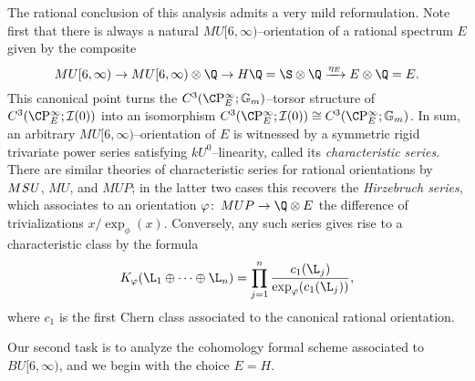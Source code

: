 \begin{remark}
The rational conclusion of this analysis admits a very mild reformulation.  Note first that there is always a natural \(MU[6, \infty)\)--orientation of a rational spectrum \(E\) given by the composite \[MU[6, \infty) \to MU[6, \infty) \otimes \Q \to H\Q = \S \otimes \Q \xrightarrow{\eta_E} E \otimes \Q = E.\]  This canonical point turns the \(C^3(\CP^\infty_E; \Gm)\)--torsor structure of \(C^3(\CP^\infty_E; \sheaf I(0))\) into an isomorphism \(C^3(\CP^\infty_E; \sheaf I(0)) \cong C^3(\CP^\infty_E; \Gm)\).  In sum, an arbitrary \(MU[6, \infty)\)--orientation of \(E\) is witnessed by a symmetric rigid trivariate power series satisfying \(kU^0\)--linearity, called its \textit{characteristic series}.  There are similar theories of characteristic series for rational orientations by \(M\mathit{SU}\), \(MU\), and \(MUP\); in the latter two cases this recovers the \textit{Hirzebruch series}, which associates to an orientation \(\phi\co MUP \to \Q \otimes E\) the difference of trivializations \(x / \exp_\phi(x)\).  Conversely, any such series gives rise to a characteristic class by the formula \[K_\phi(\L_1 \oplus \cdots \oplus \L_n) = \prod_{j=1}^n \frac{c_1(\L_j)}{\exp_\phi(c_1(\L_j))},\] where \(c_1\) is the first Chern class associated to the canonical rational orientation.
\end{remark}

Our second task is to analyze the cohomology formal scheme associated to \(BU[6, \infty)\), and we begin with the choice \(E = H\).

